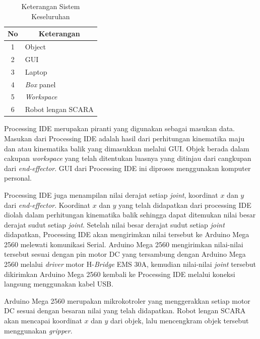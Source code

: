\begin{table}[H]
	\centering
	\caption{Keterangan Sistem Keseluruhan}
\label{tbl.sistemkeseluruhan}
		\begin{tabular}{|c|l|}
			\hline
			\rowcolor[HTML]{9B9B9B} 
			No & \multicolumn{1}{c|}{\cellcolor[HTML]{9B9B9B}Keterangan} \\ \hline
			1  & Object                                    \\ \hline
			2  & GUI                                              \\ \hline
			3  & Laptop                                        \\ \hline
			4  & \textit{Box} panel                                       \\ \hline
			5  & \textit{Workspace} \\ \hline
			6  & Robot lengan SCARA	                                    \\ \hline
	
		\end{tabular}

\end{table}
Processing IDE merupakan piranti yang digunakan sebagai masukan data. Masukan dari Processing IDE adalah hasil dari perhitungan kinematika maju dan atau kinematika balik yang dimasukkan melalui GUI. Objek berada dalam cakupan \textit{workspace} yang telah ditentukan luasnya yang ditinjau dari cangkupan dari \textit{end-effector}. GUI dari Processing IDE ini diproses menggunakan komputer personal.  

Processing IDE juga menampilan nilai derajat setiap \textit{joint}, koordinat $x$ dan $y$ dari \textit{end-effector}. Koordinat $x$ dan $y$ yang telah didapatkan dari processing IDE diolah dalam perhitungan kinematika balik sehingga dapat ditemukan nilai besar derajat sudut setiap \textit{joint}. Setelah nilai besar derajat sudut setiap \textit{joint} didapatkan, Processing IDE akan mengirimkan nilai tersebut ke Arduino Mega 2560 melewati komunikasi Serial. Arduino Mega 2560 mengirimkan nilai-nilai tersebut sesuai dengan pin motor DC yang tersambung dengan Arduino Mega 2560 melalui \textit{driver} motor H-\textit{Bridge} EMS 30A, kemudian nilai-nilai \textit{joint}  tersebut dikirimkan Arduino Mega 2560 kembali ke Processing IDE melalui koneksi langsung menggunakan kabel USB.  

Arduino Mega 2560 merupakan mikrokotroler yang menggerakkan setiap motor DC sesuai dengan besaran nilai yang telah didapatkan. Robot lengan SCARA akan mencapai koordinat $x$ dan $y$ dari objek, lalu mencengkram objek tersebut menggunakan \textit{gripper}.
